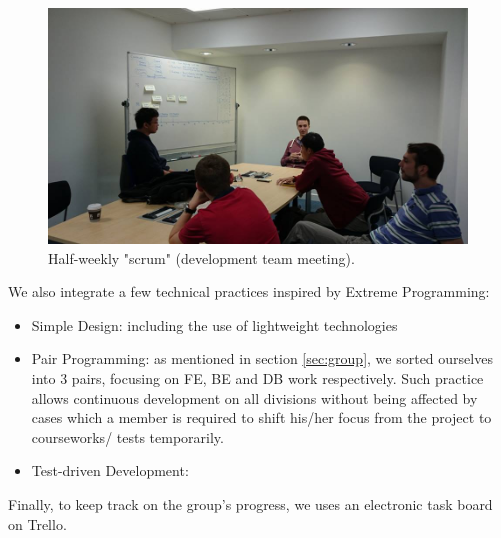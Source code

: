 \documentclass[a4paper]{article}
\begin{document}
\begin{figure}[ht]
  \centering
    \includegraphics[width = 0.99\textwidth]{./planning/scrum.jpg}
   
  \caption{Half-weekly "scrum" (development team meeting).}
  \label{fig:scrum}
\end{figure}

We also integrate a few technical practices inspired by Extreme Programming:
\begin{itemize}
  \item Simple Design: including the use of lightweight technologies
  \item Pair Programming: as mentioned in section \ref{sec:group}, we sorted
        ourselves into 3 pairs, focusing on FE, BE and DB work respectively.
        Such practice allows continuous development on all divisions without
        being affected by cases which a member is required to shift his/her
        focus from the project to courseworks/ tests temporarily.
  \item Test-driven Development: %

\end{itemize} 


Finally, to keep track on the group's progress, we uses an electronic task
board on Trello. %

\end{document}
